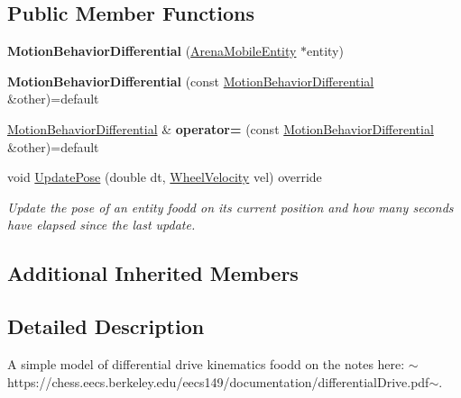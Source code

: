 \subsection*{Public Member Functions}
\begin{DoxyCompactItemize}
\item 
\mbox{\label{class_motion_behavior_differential_a8815791ac85212945862454560279d28}} 
{\bfseries Motion\+Behavior\+Differential} (\mbox{\hyperlink{class_arena_mobile_entity}{Arena\+Mobile\+Entity}} $\ast$entity)
\item 
\mbox{\label{class_motion_behavior_differential_aeaa480aac3de205e1d177c4b4ad73ed6}} 
{\bfseries Motion\+Behavior\+Differential} (const \mbox{\hyperlink{class_motion_behavior_differential}{Motion\+Behavior\+Differential}} \&other)=default
\item 
\mbox{\label{class_motion_behavior_differential_aaf4edbc2e349cb8cdbb033b16b1aef22}} 
\mbox{\hyperlink{class_motion_behavior_differential}{Motion\+Behavior\+Differential}} \& {\bfseries operator=} (const \mbox{\hyperlink{class_motion_behavior_differential}{Motion\+Behavior\+Differential}} \&other)=default
\item 
void \mbox{\hyperlink{class_motion_behavior_differential_a929c3a05aa2072acf2a508109b1259ef}{Update\+Pose}} (double dt, \mbox{\hyperlink{struct_wheel_velocity}{Wheel\+Velocity}} vel) override
\begin{DoxyCompactList}\small\item\em Update the pose of an entity foodd on its current position and how many seconds have elapsed since the last update. \end{DoxyCompactList}\end{DoxyCompactItemize}
\subsection*{Additional Inherited Members}


\subsection{Detailed Description}
A simple model of differential drive kinematics foodd on the notes here\+: $\sim$https\+://chess.eecs.\+berkeley.\+edu/eecs149/documentation/differential\+Drive.\+pdf$\sim$. 

